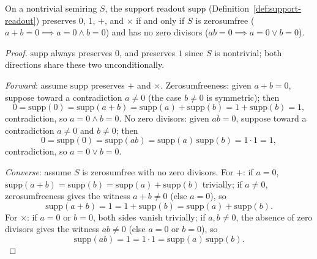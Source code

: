 \begin{lemma}
\label{lem:support-hom-iff}
\leanok
On a nontrivial semiring $S$, the support readout $\mathrm{supp}$
(Definition~\ref{def:support-readout}) preserves $0$, $1$, $+$, and
$\times$ if and only if $S$ is zerosumfree ($a+b=0 \implies a=0 \wedge
b=0$) and has no zero divisors ($ab=0 \implies a=0 \vee b=0$).
\end{lemma}

\begin{proof}
\leanok
$\mathrm{supp}$ always preserves $0$, and preserves $1$ since $S$ is
nontrivial; both directions share these two unconditionally.

\emph{Forward}: assume $\mathrm{supp}$ preserves $+$ and $\times$.
Zerosumfreeness: given $a+b=0$, suppose toward a contradiction $a\ne0$
(the case $b\ne0$ is symmetric); then
\[
  0 = \mathrm{supp}(0) = \mathrm{supp}(a+b) = \mathrm{supp}(a)+\mathrm{supp}(b)
    = 1 + \mathrm{supp}(b) = 1,
\]
contradiction, so $a=0 \wedge b=0$. No zero divisors: given $ab=0$,
suppose toward a contradiction $a\ne0$ and $b\ne0$; then
\[
  0 = \mathrm{supp}(0) = \mathrm{supp}(ab) = \mathrm{supp}(a)\,\mathrm{supp}(b)
    = 1 \cdot 1 = 1,
\]
contradiction, so $a=0 \vee b=0$.

\emph{Converse}: assume $S$ is zerosumfree with no zero divisors. For
$+$: if $a=0$, $\mathrm{supp}(a+b)=\mathrm{supp}(b)=\mathrm{supp}(a)+\mathrm{supp}(b)$
trivially; if $a\ne0$, zerosumfreeness gives the witness $a+b\ne0$
(else $a=0$), so
\[
  \mathrm{supp}(a+b) = 1 = 1+\mathrm{supp}(b) = \mathrm{supp}(a)+\mathrm{supp}(b).
\]
For $\times$: if $a=0$ or $b=0$, both sides vanish trivially; if
$a,b\ne0$, the absence of zero divisors gives the witness $ab\ne0$
(else $a=0$ or $b=0$), so
\[
  \mathrm{supp}(ab) = 1 = 1\cdot1 = \mathrm{supp}(a)\,\mathrm{supp}(b).
\]
\end{proof}

